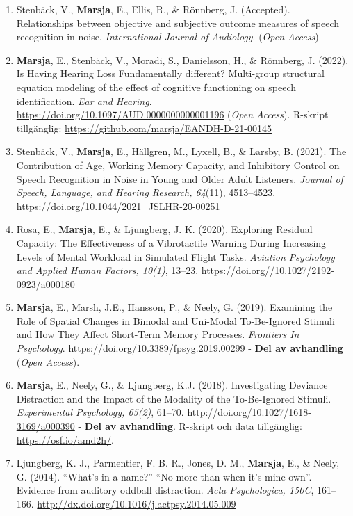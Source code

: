 \documentclass[]{article}
\begin{document}
\begin{enumerate}
\def\labelenumi{\arabic{enumi}.}
\item
  Stenbäck, V., \textbf{Marsja}, E., Ellis, R., \& Rönnberg, J.
  (Accepted). Relationships between objective and subjective outcome
  measures of speech recognition in noise. \emph{International Journal
  of Audiology}. (\emph{Open Access})
\item
  \textbf{Marsja}, E., Stenbäck, V., Moradi, S., Danielsson, H., \&
  Rönnberg, J. (2022). Is Having Hearing Loss Fundamentally different?
  Multi-group structural equation modeling of the effect of cognitive
  functioning on speech identification. \emph{Ear and Hearing}.
  \url{https://doi.org/10.1097/AUD.0000000000001196} (\emph{Open
  Access}). R-skript tillgänglig:
  \url{https://github.com/marsja/EANDH-D-21-00145}
\item
  Stenbäck, V., \textbf{Marsja}, E., Hällgren, M., Lyxell, B., \&
  Larsby, B. (2021). The Contribution of Age, Working Memory Capacity,
  and Inhibitory Control on Speech Recognition in Noise in Young and
  Older Adult Listeners. \emph{Journal of Speech, Language, and Hearing
  Research, 64}(11), 4513--4523.
  \url{https://doi.org/10.1044/2021_JSLHR-20-00251}
\item
  Rosa, E., \textbf{Marsja}, E., \& Ljungberg, J. K. (2020). Exploring
  Residual Capacity: The Effectiveness of a Vibrotactile Warning During
  Increasing Levels of Mental Workload in Simulated Flight Tasks.
  \emph{Aviation Psychology and Applied Human Factors, 10(1)}, 13--23.
  \url{https://doi.org//10.1027/2192-0923/a000180}
\item
  \textbf{Marsja}, E., Marsh, J.E., Hansson, P., \& Neely, G. (2019).
  Examining the Role of Spatial Changes in Bimodal and Uni-Modal
  To-Be-Ignored Stimuli and How They Affect Short-Term Memory Processes.
  \emph{Frontiers In Psychology}.
  \url{https://doi.org/10.3389/fpsyg.2019.00299} - \textbf{Del av
  avhandling} (\emph{Open Access}).
\item
  \textbf{Marsja}, E., Neely, G., \& Ljungberg, K.J. (2018).
  Investigating Deviance Distraction and the Impact of the Modality of
  the To-Be-Ignored Stimuli. \emph{Experimental Psychology, 65(2)},
  61--70. \url{http://doi.org/10.1027/1618-3169/a000390} - \textbf{Del
  av avhandling}. R-skript och data tillgänglig:
  \url{https://osf.io/amd2h/}.
\item
  Ljungberg, K. J., Parmentier, F. B. R., Jones, D. M., \textbf{Marsja},
  E., \& Neely, G. (2014). ``What's in a name?'' ``No more than when
  it's mine own''. Evidence from auditory oddball distraction.
  \emph{Acta Psychologica, 150C}, 161--166.
  \url{http://dx.doi.org/10.1016/j.actpsy.2014.05.009}
\end{enumerate}
\end{document}
